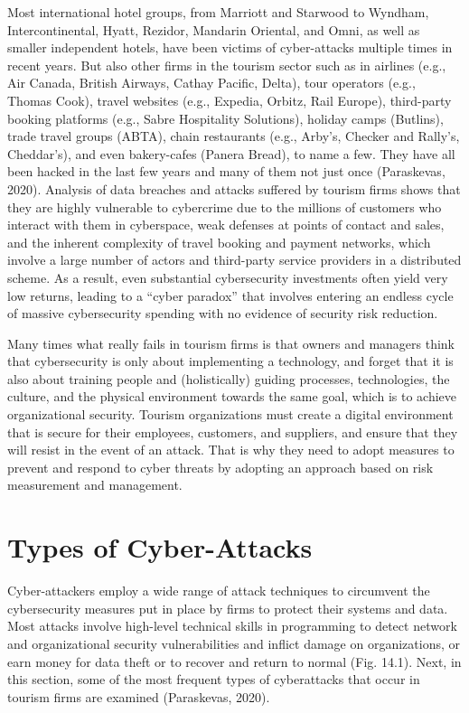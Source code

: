 \documentclass[
  letterpaper,
  DIV=11,
  numbers=noendperiod]{scrreprt}
\begin{document}
Most international hotel groups, from Marriott and Starwood to Wyndham,
Intercontinental, Hyatt, Rezidor, Mandarin Oriental, and Omni, as well
as smaller independent hotels, have been victims of cyber-attacks
multiple times in recent years. But also other firms in the tourism
sector such as in airlines (e.g., Air Canada, British Airways, Cathay
Pacific, Delta), tour operators (e.g., Thomas Cook), travel websites
(e.g., Expedia, Orbitz, Rail Europe), third-party booking platforms
(e.g., Sabre Hospitality Solutions), holiday camps (Butlins), trade
travel groups (ABTA), chain restaurants (e.g., Arby's, Checker and
Rally's, Cheddar's), and even bakery-cafes (Panera Bread), to name a
few. They have all been hacked in the last few years and many of them
not just once (Paraskevas, 2020). Analysis of data breaches and attacks
suffered by tourism firms shows that they are highly vulnerable to
cybercrime due to the millions of customers who interact with them in
cyberspace, weak defenses at points of contact and sales, and the
inherent complexity of travel booking and payment networks, which
involve a large number of actors and third-party service providers in a
distributed scheme. As a result, even substantial cybersecurity
investments often yield very low returns, leading to a ``cyber paradox''
that involves entering an endless cycle of massive cybersecurity
spending with no evidence of security risk reduction.

Many times what really fails in tourism firms is that owners and
managers think that cybersecurity is only about implementing a
technology, and forget that it is also about training people and
(holistically) guiding processes, technologies, the culture, and the
physical environment towards the same goal, which is to achieve
organizational security. Tourism organizations must create a digital
environment that is secure for their employees, customers, and
suppliers, and ensure that they will resist in the event of an attack.
That is why they need to adopt measures to prevent and respond to cyber
threats by adopting an approach based on risk measurement and
management.

\hypertarget{types-of-cyber-attacks}{%
\section{Types of Cyber-Attacks}\label{types-of-cyber-attacks}}

Cyber-attackers employ a wide range of attack techniques to circumvent
the cybersecurity measures put in place by firms to protect their
systems and data. Most attacks involve high-level technical skills in
programming to detect network and organizational security
vulnerabilities and inflict damage on organizations, or earn money for
data theft or to recover and return to normal (Fig. 14.1). Next, in this
section, some of the most frequent types of cyberattacks that occur in
tourism firms are examined (Paraskevas, 2020).
\end{document}
